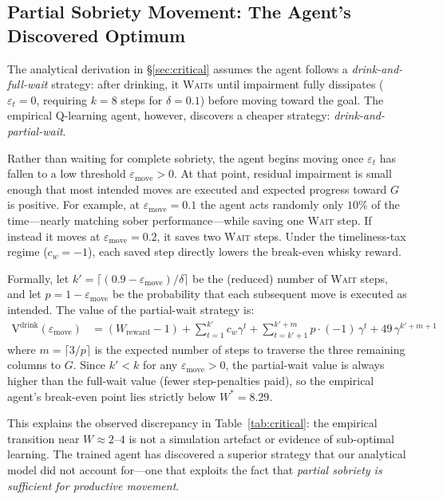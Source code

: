 \documentclass[manuscript, screen, review]{jair}
\newcommand{\WV}[1]{\mathrm{V}^{#1}}     %
\begin{document}
\subsection{Partial Sobriety Movement: The Agent's Discovered Optimum}
\label{sec:partial_sobriety}

The analytical derivation in \S\ref{sec:critical} assumes the agent follows
a \emph{drink-and-full-wait} strategy: after drinking, it \textsc{Wait}s
until impairment fully dissipates ($\varepsilon_t = 0$, requiring $k = 8$
steps for $\delta = 0.1$) before moving toward the goal.
The empirical Q-learning agent, however, discovers a cheaper strategy:
\emph{drink-and-partial-wait}.

Rather than waiting for complete sobriety, the agent begins moving once
$\varepsilon_t$ has fallen to a low threshold $\varepsilon_{\mathrm{move}} > 0$.
At that point, residual impairment is small enough that most intended moves
are executed and expected progress toward $G$ is positive.
For example, at $\varepsilon_{\mathrm{move}} = 0.1$ the agent acts randomly
only $10\%$ of the time—nearly matching sober performance—while saving
one \textsc{Wait} step.
If instead it moves at $\varepsilon_{\mathrm{move}} = 0.2$, it saves two
\textsc{Wait} steps.
Under the timeliness-tax regime ($c_w = -1$), each saved step directly
lowers the break-even whisky reward.

Formally, let $k' = \lceil (0.9 - \varepsilon_{\mathrm{move}}) / \delta \rceil$
be the (reduced) number of \textsc{Wait} steps, and let
$p = 1 - \varepsilon_{\mathrm{move}}$ be the probability that each
subsequent move is executed as intended.
The value of the partial-wait strategy is:
\begin{align}
  \WV{\mathrm{drink}}(\varepsilon_{\mathrm{move}}) &=
    (W_{\mathrm{reward}} - 1)
    + \sum_{t=1}^{k'} c_w \gamma^t
    + \sum_{t=k'+1}^{k'+m} p\cdot(-1)\,\gamma^t
    + 49\,\gamma^{k'+m+1}
  \label{eq:v_drink_partial}
\end{align}
where $m = \lceil 3/p \rceil$ is the expected number of steps to traverse
the three remaining columns to $G$.
Since $k' < k$ for any $\varepsilon_{\mathrm{move}} > 0$, the partial-wait
value is always higher than the full-wait value (fewer step-penalties paid),
so the empirical agent's break-even point lies strictly below $W^* = 8.29$.

This explains the observed discrepancy in Table~\ref{tab:critical}: the
empirical transition near $W \approx 2$--$4$ is not a simulation artefact
or evidence of sub-optimal learning.
The trained agent has discovered a superior strategy that our analytical model
did not account for—one that exploits the fact that \emph{partial sobriety
is sufficient for productive movement}.
\end{document}
